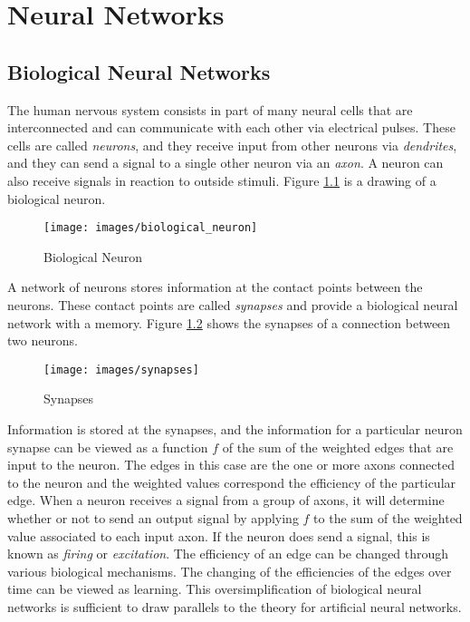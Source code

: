 \chapter[Neural Networks]{Neural Networks}

\section{Biological Neural Networks}

The human nervous system consists in part of many neural cells that are interconnected and can communicate with each other via electrical pulses.
These cells are called {\it neurons}, and they receive input from other neurons via {\it dendrites}, and they can send a signal to a single other neuron via an {\it axon}.
A neuron can also receive signals in reaction to outside stimuli.
Figure \ref{biological_neuron} is a drawing of a biological neuron. 

\begin{figure}[h!]
  \centering
  \texttt{[image: images/biological\_neuron]}
  \caption{Biological Neuron}
  \label{biological_neuron}
\end{figure}

A network of neurons stores information at the contact points between the neurons.
These contact points are called {\it synapses} and provide a biological neural network with a memory.
Figure \ref{synapses} shows the synapses of a connection between two neurons.

\begin{figure}[h!]
  \centering
  \texttt{[image: images/synapses]}
  \caption{Synapses}
  \label{synapses}
\end{figure}

Information is stored at the synapses, and the information for a particular neuron synapse can be viewed as a function $f$ of the sum of the weighted edges that are input to the neuron.
The edges in this case are the one or more axons connected to the neuron and the weighted values correspond the efficiency of the particular edge. 
When a neuron receives a signal from a group of axons, it will determine whether or not to send an output signal by applying $f$ to the sum of the weighted value associated to each input axon.
If the neuron does send a signal, this is known as {\it firing} or {\it excitation}.
The efficiency of an edge can be changed through various biological mechanisms.
The changing of the efficiencies of the edges over time can be viewed as learning.
This oversimplification of biological neural networks is sufficient to draw parallels to the theory for artificial neural networks.


